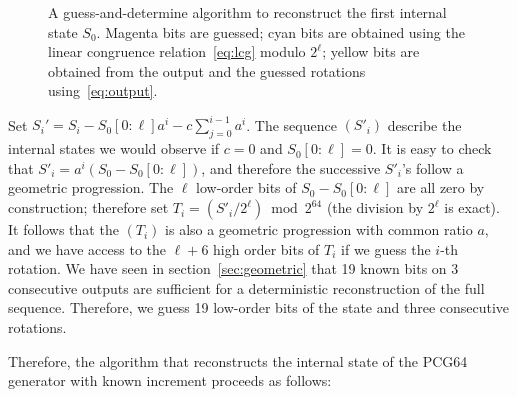 \documentclass[preprint,svgnames]{iacrtrans}
\begin{document}
\begin{figure}
\begin{center}
\end{center}
\caption{A guess-and-determine algorithm to reconstruct the first internal state
  $S_0$. Magenta bits are guessed; cyan bits are obtained using the linear
  congruence relation~\eqref{eq:lcg} modulo $2^\ell$; yellow bits are obtained
  from the output and the guessed rotations using~\eqref{eq:output}.}
\label{fig:Cknown}
\end{figure}

Set $S_i' = S_i - S_0[0:\ell] a^i - c \sum_{j=0}^{i-1} a^i$. The sequence
$(S'_i)$ describe the internal states we would observe if $c=0$ and
$S_0[0:\ell] = 0$. It is easy to check that $S'_{i} = a^i (S_0 - S_0[0:\ell])$,
and therefore the successive $S'_i$'s follow a geometric progression. %
The $\ell$ low-order bits of $S_0 - S_0[0:\ell]$ are all zero by construction;
therefore set $T_i = \left(S'_i / 2^\ell\right) \bmod 2^{64}$ (the division by
$2^\ell$ is exact). It follows that the $(T_i)$ is also a geometric progression
with common ratio $a$, and we have access to the $\ell+6$ high order bits of
$T_i$ if we guess the $i$-th rotation. We have seen in
section~\ref{sec:geometric} that 19 known bits on 3 consecutive outputs are
sufficient for a deterministic reconstruction of the full sequence. Therefore,
we guess 19 low-order bits of the state and three consecutive rotations.

Therefore, the algorithm that reconstructs the internal state of the
\textsf{PCG64} generator with known increment proceeds as follows:
\end{document}
